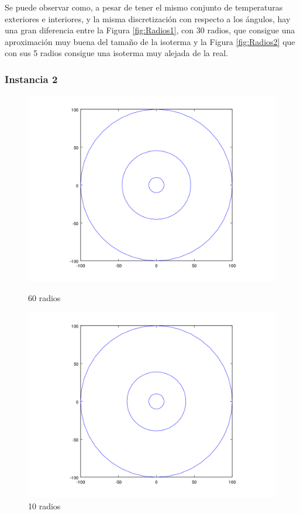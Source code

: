 Se puede observar como, a pesar de tener el mismo conjunto de temperaturas exteriores e interiores, y la misma discretización con respecto a los ángulos, hay una gran diferencia entre la Figura \ref{fig:Radios1}, con 30 radios, que consigue una aproximación muy buena del tamaño de la isoterma y la Figura \ref{fig:Radios2} que con sus 5 radios consigue una isoterma muy alejada de la real.

\subsubsection{Instancia 2}


\begin{figure}[H]
\centering
\begin{minipage}{0.48\textwidth}
  \centering
    \includegraphics[width=1\textwidth]{imgs/comp_rads_malo/comp_rads_iso5.png}
	\caption{60 radios}  
  \label{fig:Radios3}
\end{minipage}%
\hspace{0.03\textwidth}
\begin{minipage}{0.48\textwidth}   
  \centering
    \includegraphics[width=1\textwidth]{imgs/comp_rads_malo/comp_rads_iso0.png} 
	\caption{10 radios} 
  \label{fig:Radios4}
\end{minipage}
\end{figure}

